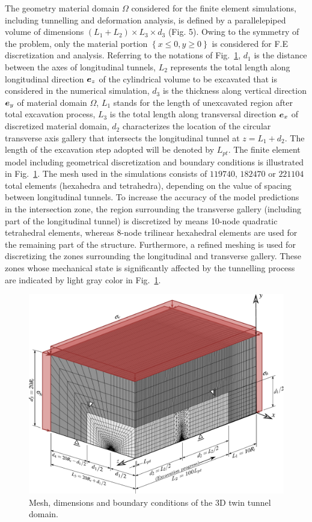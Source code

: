 \documentclass[a4paper,fleqn]{cas-sc}
\begin{document}
The geometry material domain $\Omega$ considered for the finite element simulations, including tunnelling and deformation analysis, is defined by a parallelepiped volume of dimensions $\left(L_1+L_2 \right ) \times L_3 \times d_3$ (Fig. 5). Owing to the symmetry of the problem, only the material portion $\left\{x \le 0, y \ge 0\right\}$   is considered for F.E discretization and analysis. Referring to the notations of Fig.~\ref{Mesh1}, $d_1$ is the distance between the axes of longitudinal tunnels, $L_2$  represents the total length  along longitudinal direction $\boldsymbol{e}_z$ of the cylindrical  volume to be excavated that is  considered in the numerical simulation, $d_3$ is the thickness along vertical direction $\boldsymbol{e}_y$ of material domain $\Omega$, $L_1$ stands for the length of unexcavated region after total excavation process, $L_3$ is the total length along transversal direction $\boldsymbol{e}_x$ of discretized material domain, $d_2$ characterizes the location of the circular transverse axis gallery that intersects the  longitudinal tunnel at $z = L_1+d_2$. The length of the excavation step adopted  will be denoted by $L_{pt}$. The finite element model including geometrical discretization and boundary conditions is illustrated in Fig.~\ref{Mesh1}. The mesh used in the simulations consists of $119740$, $182470$ or $221104$ total elements (hexahedra and tetrahedra), depending on the value of spacing between longitudinal tunnels. To increase the accuracy of the model predictions in the intersection zone, the region surrounding the transverse gallery (including part of the longitudinal tunnel) is discretized by means 10-node quadratic tetrahedral elements, whereas 8-node trilinear hexahedral elements are used for the remaining part of the structure.   Furthermore, a refined meshing is used for discretizing the zones surrounding the longitudinal and transverse gallery. These zones whose mechanical state is significantly affected by the tunnelling process are indicated by light gray color in Fig.~\ref{Mesh1}.
\begin{figure}[h!]
	\centering
	\includegraphics[scale=0.5]{Mesh1.pdf}
	\caption{Mesh, dimensions and boundary conditions of the 3D twin tunnel domain.}
	\label{Mesh1}
\end{figure}
\end{document}
